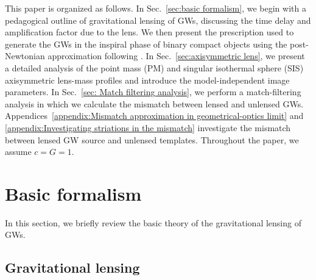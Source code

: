 \documentclass[floats,floatfix,showpacs,amssymb,prd,twocolumn,superscriptaddress,nofootinbib,nolongbibliography,reprint]{revtex4-2}
\begin{document}
This paper is organized as follows. In Sec.~\ref{sec:basic formalism}, we begin with a pedagogical outline of gravitational lensing of GWs, discussing the time delay and amplification factor due to the lens. We then present the prescription used to generate the GWs in the inspiral phase of binary compact objects using the post-Newtonian approximation following \cite{PhysRevD.49.2658}. In Sec.~\ref{sec:axisymmetric lens}, we present a detailed analysis of the  point mass (PM) and singular isothermal sphere (SIS) axisymmetric lens-mass profiles and introduce the model-independent image parameters. In Sec.~\ref{sec: Match filtering analysis}, we perform a match-filtering analysis in which we calculate the mismatch between lensed and unlensed GWs. Appendices~\ref{appendix:Mismatch approximation in geometrical-optics limit} and \ref{appendix:Investigating striations in the mismatch} investigate the mismatch between lensed GW source and unlensed templates. Throughout the paper, we assume $c = G = 1$.

\section{\label{sec:basic formalism} Basic formalism }

In this section, we briefly review the basic theory of the gravitational lensing of GWs.

\subsection{\label{subsec:gravitational lensing}Gravitational lensing}
\end{document}
